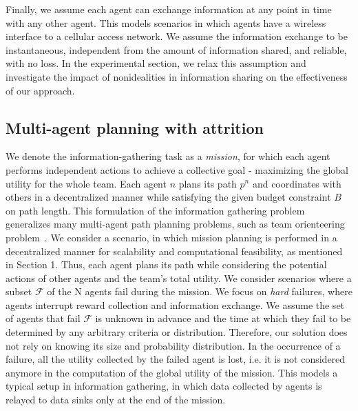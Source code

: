Finally, we assume each agent can exchange information at any point in time with any other agent. This models scenarios in which agents have a wireless interface to a cellular access network. We assume the information exchange to be instantaneous, independent from the amount of information shared, and reliable, with no loss. In the experimental section, we relax this assumption and investigate the impact of nonidealities in information sharing on the effectiveness of our approach.

\subsection{Multi-agent planning with attrition}

\label{sec:attrition_settings}

We denote the information-gathering task as a \textit{mission}, for which each agent performs independent actions to achieve a collective goal - maximizing the global utility for the whole team. Each agent $n$ plans its path $p^n$ and coordinates with others in a decentralized manner while satisfying the given budget constraint $B$ on path length.
This formulation of the information gathering problem generalizes many multi-agent path planning problems, such as team orienteering problem~\citep{best2018online}.
We consider a scenario, in which mission planning is performed in a decentralized manner for scalability and computational feasibility, as mentioned in Section 1.
Thus, each agent plans its path while considering the potential actions of other agents and the team's total utility.
We consider scenarios where a subset $\mathcal{F}$ of the N agents fail during the mission. We focus on \textit{hard} failures, where agents interrupt reward collection and information exchange.
We assume the set of agents that fail $\mathcal{F}$ is unknown in advance and the time at which they fail to be determined by any arbitrary criteria or distribution. Therefore, our solution does not rely on knowing its size and probability distribution.
In the occurrence of a failure, all the utility collected by the failed agent is lost, i.e. it is not considered anymore in the computation of the global utility of the mission. This models a typical setup in information gathering, in which data collected by agents is relayed to data sinks only at the end of the mission.

